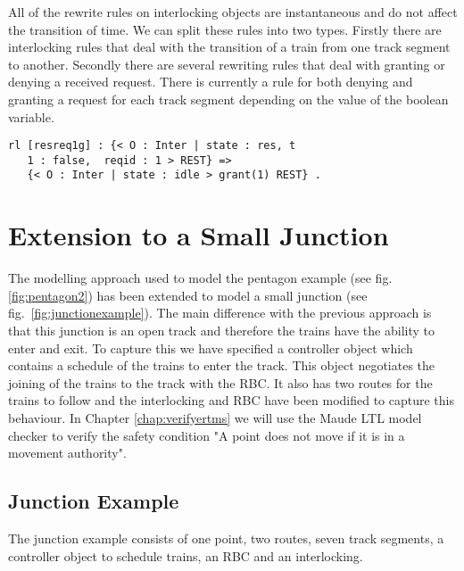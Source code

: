 All of the rewrite rules on interlocking objects are instantaneous and do not affect the transition of time.  We can split these rules into two types. Firstly there are interlocking rules that deal with the transition of a train from one track segment to another. Secondly there are several rewriting rules that deal with granting or denying a received request. There is currently a rule for both denying and granting a request for each track segment depending on the value of the boolean variable.

\begin{lstlisting}[caption = The interlocking transition which grants a track segment request]
rl [resreq1g] : {< O : Inter | state : res, t
   1 : false,  reqid : 1 > REST} => 
   {< O : Inter | state : idle > grant(1) REST} .
\end{lstlisting}

\section{Extension to a Small Junction}
The modelling approach used to model the pentagon example (see fig. \ref{fig:pentagon2}) has been extended to model a small junction (see fig.~\ref{fig:junctionexample}). The main difference with the previous approach is that this junction is an open track and therefore the trains have the ability to enter and exit. To capture this we have specified a controller object which contains a schedule of the trains to enter the track. This object negotiates the joining of the trains to the track with the RBC. It also has two routes for the trains to follow and the interlocking and RBC have been modified to capture this behaviour.  In Chapter \ref{chap:verifyertms} we will use the Maude LTL model checker to verify the safety condition "A point does not move if it is in a movement authority".
 
\subsection*{Junction Example}
The junction example consists of one point, two routes, seven track segments, a controller object to schedule trains, an RBC and an interlocking.

